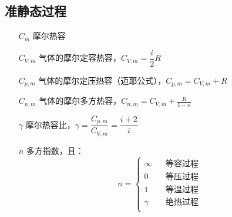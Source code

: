 \documentclass{article}
\begin{document}
\subsection{准静态过程}

\begin{enumerate}
    \item[$C_m$] 摩尔热容
    \item[$C_{V,m}$] 气体的摩尔定容热容，$C_{V,m}=\dfrac i2R$
    \item[$C_{p,m}$] 气体的摩尔定压热容（迈耶公式），$C_{p,m}=C_{V,m}+R$
    \item[$C_{n,m}$] 气体的摩尔多方热容，$C_{n,m}=C_{V,m}+\frac R{1-n}$
    \item[$\gamma$] 摩尔热容比，$\gamma=\dfrac{C_{p,m}}{C_{V,m}}=\dfrac{i+2}i$
    \item[$n$] 多方指数，且：
        \[n=\left\{\begin{aligned}
                \infty &  & \text{等容过程} \\
                0      &  & \text{等压过程} \\
                1      &  & \text{等温过程} \\
                \gamma &  & \text{绝热过程} \\
            \end{aligned}\right.\]
\end{enumerate}
\end{document}
